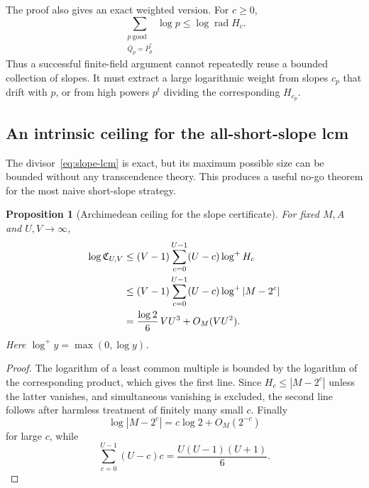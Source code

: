 \documentclass[11pt]{article}
\newtheorem{proposition}[theorem]{Proposition}
\theoremstyle{definition}
\theoremstyle{remark}
\newcommand{\rad}{\operatorname{rad}}
\begin{document}
The proof also gives an exact weighted version.  For $c\ge0$,
\begin{equation}
 \sum_{\substack{p\ \mathrm{good}\\ \bar Q_p=\bar P_p^c}}\log p
 \le \log\rad H_c.
 \label{eq:fixed-slope-weight}
\end{equation}
Thus a successful finite-field argument cannot repeatedly reuse a bounded collection of slopes.  It must extract a large logarithmic weight from slopes $c_p$ that drift with $p$, or from high powers $p^t$ dividing the corresponding $H_{c_p}$.

\subsection{An intrinsic ceiling for the all-short-slope lcm}

The divisor~\eqref{eq:slope-lcm} is exact, but its maximum possible size can be bounded without any transcendence theory.  This produces a useful no-go theorem for the most naive short-slope strategy.

\begin{proposition}[Archimedean ceiling for the slope certificate]
\label{prop:slope-ceiling}
For fixed $M,A$ and $U,V\to\infty$,
\begin{align}
 \log \mathfrak C_{U,V}
 &\le (V-1)\sum_{c=0}^{U-1}(U-c)\log^+ H_c \notag\\
 &\le (V-1)\sum_{c=0}^{U-1}(U-c)\log^+|M-2^c| \notag\\
 &=\frac{\log2}{6}\,VU^3+O_M(VU^2).
 \label{eq:slope-ceiling}
\end{align}
Here $\log^+y=\max(0,\log y)$.
\end{proposition}

\begin{proof}
The logarithm of a least common multiple is bounded by the logarithm of the corresponding product, which gives the first line.  Since $H_c\le |M-2^c|$ unless the latter vanishes, and simultaneous vanishing is excluded, the second line follows after harmless treatment of finitely many small $c$.  Finally
\[
 \log|M-2^c|=c\log2+O_M(2^{-c})
\]
for large $c$, while
\[
 \sum_{c=0}^{U-1}(U-c)c=\frac{U(U-1)(U+1)}6.
\]
\end{proof}
\end{document}
